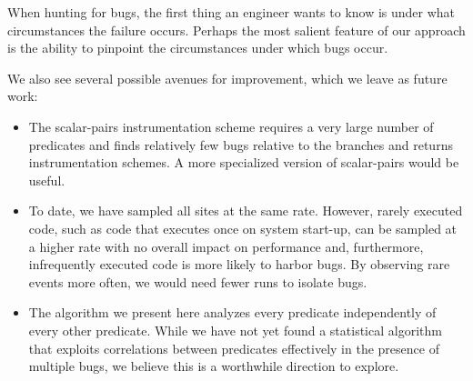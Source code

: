 \documentclass[draft]{sig-alternate}
\begin{document}
When hunting for bugs, the first thing an engineer wants to know is
under what circumstances the failure occurs.  Perhaps the most salient
feature of our approach is the ability to pinpoint the circumstances
under which bugs occur.

We also see several possible avenues for improvement, which we leave
as future work:
\begin{itemize}

\item The scalar-pairs instrumentation scheme requires a very large number
of predicates and finds relatively few bugs relative to the branches and
returns instrumentation schemes.  A more specialized version of scalar-pairs
would be useful.

\item To date, we have sampled all sites at the same rate.  However,
rarely executed code, such as code that executes once on system start-up,
can be sampled at a higher rate with no overall impact on performance and,
furthermore, infrequently executed code is more likely
to harbor bugs.  By observing rare events more often, we would need fewer
runs to isolate bugs.

\item The algorithm we present here analyzes every predicate independently
of every other predicate.  While we have not yet found a statistical algorithm that exploits
correlations between predicates effectively in the presence of
multiple bugs, we believe this is a worthwhile direction
to explore.
\end{itemize}



\end{document}
